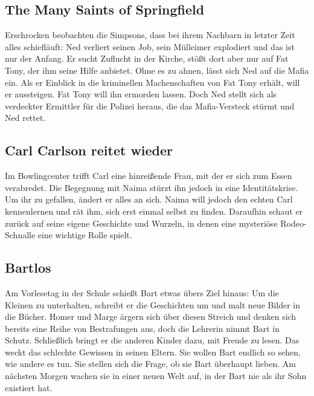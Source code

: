 \subsection{The Many Saints of Springfield}
Erschrocken beobachten die Simpsons, dass bei ihrem Nachbarn in letzter Zeit alles schiefläuft: Ned verliert seinen Job, sein Mülleimer explodiert und das ist nur der Anfang. Er sucht Zuflucht in der Kirche, stößt dort aber nur auf Fat Tony, der ihm seine Hilfe anbietet. Ohne es zu ahnen, lässt sich Ned auf die Mafia ein. Als er Einblick in die kriminellen Machenschaften von Fat Tony erhält, will er aussteigen. Fat Tony will ihn ermorden lassen. Doch Ned stellt sich als verdeckter Ermittler für die Polizei heraus, die das Mafia-Versteck stürmt und Ned rettet.


\subsection{Carl Carlson reitet wieder}\label{OABF08}
Im Bowlingcenter trifft Carl eine hinreißende Frau, mit der er sich zum Essen verabredet. Die Begegnung mit Naima stürzt ihn jedoch in eine Identitätskrise. Um ihr zu gefallen, ändert er alles an sich. Naima will jedoch den echten Carl kennenlernen und rät ihm, sich erst einmal selbst zu finden. Daraufhin schaut er zurück auf seine eigene Geschichte und Wurzeln, in denen eine mysteriöse Rodeo-Schnalle eine wichtige Rolle spielt.


\subsection{Bartlos}
Am Vorlesetag in der Schule schießt Bart etwas übers Ziel hinaus: Um die Kleinen zu unterhalten, schreibt er die Geschichten um und malt neue Bilder in die Bücher. Homer und Marge ärgern sich über diesen Streich und denken sich bereits eine Reihe von Bestrafungen aus, doch die Lehrerin nimmt Bart in Schutz. Schließlich bringt er die anderen Kinder dazu, mit Freude zu lesen. Das weckt das schlechte Gewissen in seinen Eltern. Sie wollen Bart endlich so sehen, wie andere es tun. Sie stellen sich die Frage, ob sie Bart überhaupt lieben. Am nächsten Morgen wachen sie in einer neuen Welt auf, in der Bart nie als ihr Sohn existiert hat.

